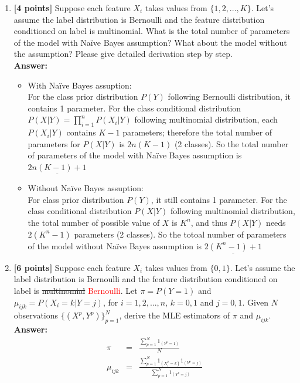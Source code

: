 \documentclass{article}
\begin{document}
\begin{enumerate}
\item\textbf{[4 points]} Suppose each feature $X_i$ takes values from $\{1,2,...,K\}$. Let's assume the label distribution is Bernoulli and the feature distribution conditioned on label is multinomial. What is the total number of parameters of the model with Na{\"i}ve Bayes assumption? What about the model without the assumption? Please give detailed derivation step by step.\\
\textbf{Answer:}\\
\begin{itemize}
	\item With Na{\"i}ve Bayes assuption:\\
	For the class prior distribution $P(Y)$ following Bernoulli distribution, it contains 1 parameter. For the class conditional distribution $P(X|Y)=\prod_{i=1}^{n} P(X_i|Y)$ following multinomial distribution, each $P(X_i|Y)$ contains $K-1$ parameters; therefore the total number of parameters for $P(X|Y)$ is $2n(K-1)$ (2 classes). So the total number of parameters of the model with Na{\"i}ve Bayes assumption is $\underline{2n(K-1)+1}$
	\item Without Na{\"i}ve Bayes assuption:\\
	For class prior distribution $P(Y)$, it still contains 1 parameter. For the class conditional distribution $P(X|Y)$ following multinomial distribution, the total number of possible value of $X$ is $K^n$, and thus $P(X|Y)$ needs $2(K^n-1)$ parameters (2 classes). So the totoal number of parameters of the model without Na{\"i}ve Bayes assumption is $\underline{2(K^n-1)+1}$
	
\end{itemize}


\item\textbf{[6 points]} Suppose each feature $X_i$ takes values from $\{0,1\}$. Let's assume the label distribution is Bernoulli and the feature distribution conditioned on label is \sout{multinomial} \textcolor{red}{Bernoulli}. Let $\pi = P(Y=1)$ and $\mu_{ijk}=P(X_i=k|Y=j)$, for $i=1,2,...,n$, $k=0,1$ and $j=0,1$. Given $N$ observations $\{(X^{p},Y^{p})\}_{p=1}^N$, derive the MLE estimators of $\pi$ and $\mu_{ijk}$.\\
\textbf{Answer:}\\
\begin{equation}
\nonumber
\begin{array}{rcl}
\pi & = &　\frac{\sum_{p=1}^{N} 1_{(Y^p=1)}}{N} \\
\mu_{ijk} & = & \frac{\sum_{p=1}^{N}1_{(X_i^p=k)}1_{(Y^p=j)}}{\sum_{p=1}^{N}1_{(Y^p=j)}} \\
\end{array}
\end{equation}


\end{enumerate}
\end{document}
